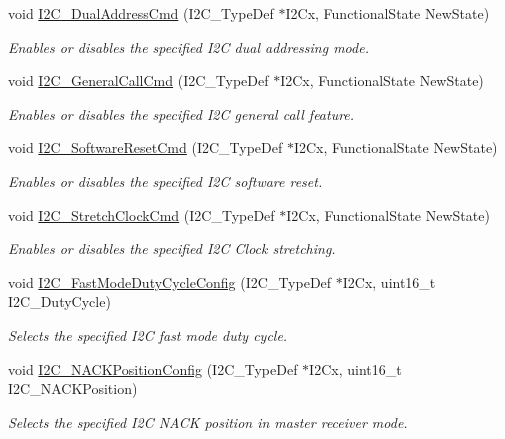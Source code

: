 \begin{DoxyCompactItemize}
void \mbox{\hyperlink{group___i2_c_ga02145a333a56e79557d6ef4ea03fc313}{I2\+C\+\_\+\+Dual\+Address\+Cmd}} (I2\+C\+\_\+\+Type\+Def $\ast$I2\+Cx, Functional\+State New\+State)
\begin{DoxyCompactList}\small\item\em Enables or disables the specified I2C dual addressing mode. \end{DoxyCompactList}\item 
void \mbox{\hyperlink{group___i2_c_ga65c740fc8d7b3b9f15cc432d8699d471}{I2\+C\+\_\+\+General\+Call\+Cmd}} (I2\+C\+\_\+\+Type\+Def $\ast$I2\+Cx, Functional\+State New\+State)
\begin{DoxyCompactList}\small\item\em Enables or disables the specified I2C general call feature. \end{DoxyCompactList}\item 
void \mbox{\hyperlink{group___i2_c_ga1289c908aeb882443aba323b459c638b}{I2\+C\+\_\+\+Software\+Reset\+Cmd}} (I2\+C\+\_\+\+Type\+Def $\ast$I2\+Cx, Functional\+State New\+State)
\begin{DoxyCompactList}\small\item\em Enables or disables the specified I2C software reset. \end{DoxyCompactList}\item 
void \mbox{\hyperlink{group___i2_c_ga7459feb3b1dfcd3e4f6574002ca7d3bd}{I2\+C\+\_\+\+Stretch\+Clock\+Cmd}} (I2\+C\+\_\+\+Type\+Def $\ast$I2\+Cx, Functional\+State New\+State)
\begin{DoxyCompactList}\small\item\em Enables or disables the specified I2C Clock stretching. \end{DoxyCompactList}\item 
void \mbox{\hyperlink{group___i2_c_gaa570f76bc34e5b0531b29b1a90af1275}{I2\+C\+\_\+\+Fast\+Mode\+Duty\+Cycle\+Config}} (I2\+C\+\_\+\+Type\+Def $\ast$I2\+Cx, uint16\+\_\+t I2\+C\+\_\+\+Duty\+Cycle)
\begin{DoxyCompactList}\small\item\em Selects the specified I2C fast mode duty cycle. \end{DoxyCompactList}\item 
void \mbox{\hyperlink{group___i2_c_gad08ebffc3a234d84e6405ec115bd74f1}{I2\+C\+\_\+\+N\+A\+C\+K\+Position\+Config}} (I2\+C\+\_\+\+Type\+Def $\ast$I2\+Cx, uint16\+\_\+t I2\+C\+\_\+\+N\+A\+C\+K\+Position)
\begin{DoxyCompactList}\small\item\em Selects the specified I2C N\+A\+CK position in master receiver mode. \end{DoxyCompactList}\item 

\end{DoxyCompactItemize}
